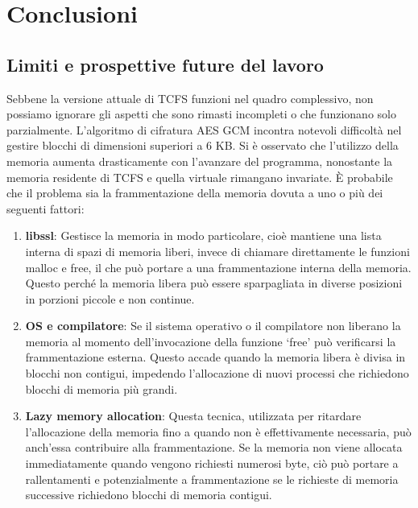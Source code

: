 \chapter{Conclusioni}
\section{Limiti e prospettive future del lavoro}
Sebbene la versione attuale di TCFS funzioni nel quadro complessivo, non possiamo ignorare gli aspetti che sono rimasti incompleti o che funzionano solo parzialmente. L’algoritmo di cifratura AES GCM incontra notevoli difficoltà nel gestire blocchi di dimensioni superiori a 6 KB. Si è osservato che l’utilizzo della memoria aumenta drasticamente con l’avanzare del programma, nonostante la memoria residente di TCFS e quella virtuale rimangano invariate. È probabile che il problema sia la frammentazione della memoria dovuta a uno o più dei seguenti fattori: 
\begin{enumerate}
    \item \textbf{libssl}: Gestisce la memoria in modo particolare, cioè mantiene una lista interna di spazi di memoria liberi, invece di chiamare direttamente le funzioni malloc e free, il che può portare a una frammentazione interna della memoria. Questo perché la memoria libera può essere sparpagliata in diverse posizioni in porzioni piccole e non continue.
    \item \textbf{OS e compilatore}: Se il sistema operativo o il compilatore non liberano la memoria al momento dell’invocazione della funzione ‘free’ può verificarsi la frammentazione esterna. Questo accade quando la memoria libera è divisa in blocchi non contigui, impedendo l’allocazione di nuovi processi che richiedono blocchi di memoria più grandi.
    \item \textbf{Lazy memory allocation}: Questa tecnica, utilizzata per ritardare l’allocazione della memoria fino a quando non è effettivamente necessaria, può anch’essa contribuire alla frammentazione. Se la memoria non viene allocata immediatamente quando vengono richiesti numerosi byte, ciò può portare a rallentamenti e potenzialmente a frammentazione se le richieste di memoria successive richiedono blocchi di memoria contigui.
\end{enumerate}
